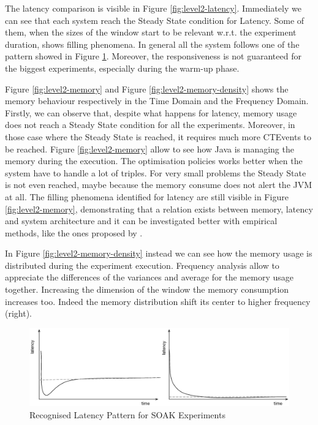 The latency comparison is visible in Figure \ref{fig:level2-latency}. Immediately we can see that each system reach the Steady State condition for Latency. Some of them, when the sizes of the window start to be relevant w.r.t. the experiment duration, shows filling phenomena. In general all the system follows one of the pattern showed in Figure \ref{fig:level2-pattern}. Moreover, the responsiveness is not guaranteed for the biggest experiments, especially during the warm-up phase.

Figure \ref{fig:level2-memory} and Figure \ref{fig:level2-memory-density} shows the memory behaviour respectively in the Time Domain and the Frequency Domain. Firstly, we can observe that, despite what happens for latency, memory usage does not reach a Steady State condition for all the experiments. Moreover, in those case where the Steady State is reached, it requires much more CTEvents to be reached. Figure \ref{fig:level2-memory} allow to see how Java is managing the memory during the execution. The optimisation policies works better when the system have to handle a lot of triples. For very small problems the Steady State is not even reached, maybe because the memory consume does not alert the JVM at all. The filling phenomena identified for latency are still visible in Figure \ref{fig:level2-memory}, demonstrating that a relation exists between memory, latency and system architecture and it can be investigated better with empirical methods, like the ones proposed by \namens.

In Figure \ref{fig:level2-memory-density} instead we can see how the memory usage is distributed during the experiment execution. Frequency analysis allow to appreciate the differences of the variances and average for the memory usage together. Increasing the dimension of the window the memory consumption increases too. Indeed the memory distribution shift its center to higher frequency (right). 


\begin{figure}[hbt]
  \centering
	\includegraphics[width=\linewidth]{images/level2-pattern}
	\caption{Recognised Latency Pattern for SOAK Experiments} 
  	\label{fig:level2-pattern}
\end{figure}

